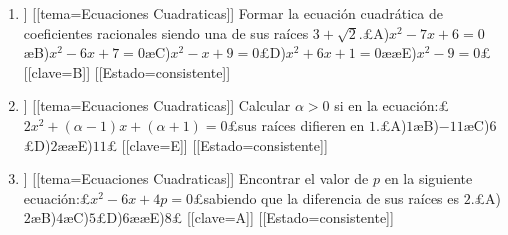 \begin{enumerate}
\item[\textbf{19.}] [[curso=Algebra]] [[tema=Ecuaciones Cuadraticas]] Formar la ecuación cuadrática de coeficientes racionales siendo una de sus raíces $3+\sqrt{2}$.£A)$x^2-7x+6=0$æB)$x^2-6x+7=0$æC)$x^2-x+9=0$£D)$x^2+6x+1=0$ææE)$x^2-9=0$£ [[clave=B]] [[Estado=consistente]]
\item[\textbf{18.}] [[curso=Algebra]] [[tema=Ecuaciones Cuadraticas]] Calcular $\alpha>0$ si en la ecuación:£$2x^2+\left(\alpha-1\right)x+\left(\alpha+1\right)=0$£sus raíces difieren en $1$.£A)$1$æB)$-11$æC)$6$£D)$2$ææE)$11$£ [[clave=E]] [[Estado=consistente]]
\item[\textbf{17.}] [[curso=Algebra]] [[tema=Ecuaciones Cuadraticas]] Encontrar el valor de $p$ en la siguiente ecuación:£$x^2-6x+4p=0$£sabiendo que la diferencia de sus raíces es $2$.£A)$2$æB)$4$æC)$5$£D)$6$ææE)$8$£ [[clave=A]] [[Estado=consistente]]
\end{enumerate}
